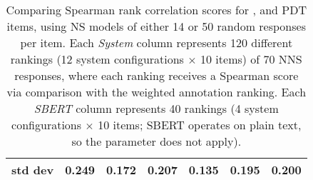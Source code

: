 \begin{table}[htb!]
\begin{center}
\begin{tabular}{|l||l|l||l|l||l|l|}
\hline
std dev & 0.249 	& 0.172 			& 0.207 	& 0.135 					& 0.195 	& 0.200 \\
\hline
\end{tabular}
\caption{\label{tab:transitivity-results} Comparing Spearman rank correlation scores for ,  and  PDT items, using NS models of either 14 or 50 random responses per item. Each \textit{System} column represents 120 different rankings (12 system configurations $\times$ 10 items) of 70 NNS responses, where each ranking receives a Spearman score via comparison with the weighted annotation ranking. Each \textit{SBERT} column represents 40 rankings (4 system configurations $\times$ 10 items; SBERT operates on plain text, so the  parameter does not apply).
}
\end{center}
\end{table}




